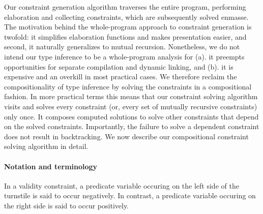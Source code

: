Our constraint generation algorithm traverses the entire program,
performing elaboration and collecting constraints, which are
subsequently solved enmasse. The motivation behind the whole-program
approach to constraint generation is twofold: it simplifies
elaboration functions and makes presentation easier, and second, it
naturally generalizes to mutual recursion. Nonetheless, we do not
intend our type inference to be a whole-program analysis for (a). it
preempts opportunities for separate compilation and dynamic linking,
and (b). it is expensive and an overkill in most practical cases. We
therefore reclaim the compositionality of type inference by solving
the constraints in a compositional fashion. In more practical terms
this means that our constraint solving algorithm visits and solves
every constraint (or, every set of mutually recursive constraints)
only once. It composes computed solutions to solve other constraints
that depend on the solved constraints. Importantly, the failure to
solve a dependent constraint does not result in backtracking. We now
describe our compositional constraint solving algorithm in detail.

\paragraph{Notation and terminology} In a validity constraint, a
predicate variable occuring on the left side of the turnstile is said
to occur negatively. In contrast, a predicate variable occuring on the
right side is said to occur positively.

